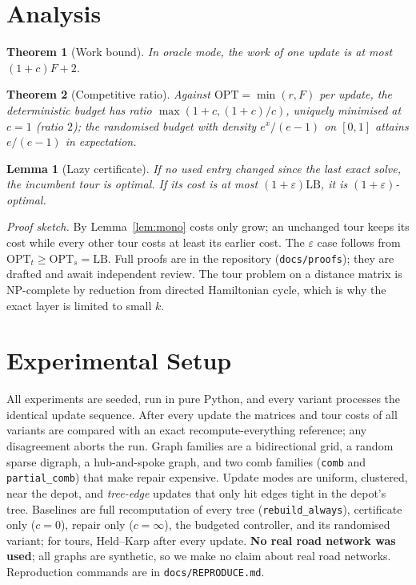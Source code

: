 \documentclass[conference]{IEEEtran}
\newtheorem{lemma}{Lemma}
\newtheorem{theorem}{Theorem}
\begin{document}
\section{Analysis}
\begin{theorem}[Work bound]
In oracle mode, the work of one update is at most $(1+c)F+2$.
\end{theorem}
\begin{theorem}[Competitive ratio]
Against $\mathrm{OPT}=\min(r,F)$ per update, the deterministic budget has ratio $\max(1+c,(1+c)/c)$, uniquely minimised at $c=1$ (ratio $2$); the randomised budget with density $e^x/(e-1)$ on $[0,1]$ attains $e/(e-1)$ in expectation.
\end{theorem}
\begin{lemma}[Lazy certificate]\label{lem:lazy}
If no used entry changed since the last exact solve, the incumbent tour is optimal. If its cost is at most $(1+\varepsilon)\mathrm{LB}$, it is $(1+\varepsilon)$-optimal.
\end{lemma}
\noindent\emph{Proof sketch.} By Lemma~\ref{lem:mono} costs only grow; an unchanged tour keeps its cost while every other tour costs at least its earlier cost. The $\varepsilon$ case follows from $\mathrm{OPT}_t\ge\mathrm{OPT}_s=\mathrm{LB}$. Full proofs are in the repository (\texttt{docs/proofs}); they are drafted and await independent review.
The tour problem on a distance matrix is NP-complete by reduction from directed Hamiltonian cycle, which is why the exact layer is limited to small $k$.

\section{Experimental Setup}
All experiments are seeded, run in pure Python, and every variant processes the identical update sequence. After every update the matrices and tour costs of all variants are compared with an exact recompute-everything reference; any disagreement aborts the run.
Graph families are a bidirectional grid, a random sparse digraph, a hub-and-spoke graph, and two comb families (\texttt{comb} and \texttt{partial\_comb}) that make repair expensive.
Update modes are uniform, clustered, near the depot, and \emph{tree-edge} updates that only hit edges tight in the depot's tree.
Baselines are full recomputation of every tree (\texttt{rebuild\_always}), certificate only ($c=0$), repair only ($c=\infty$), the budgeted controller, and its randomised variant; for tours, Held--Karp after every update.
\textbf{No real road network was used}; all graphs are synthetic, so we make no claim about real road networks.
Reproduction commands are in \texttt{docs/REPRODUCE.md}.
\end{document}
